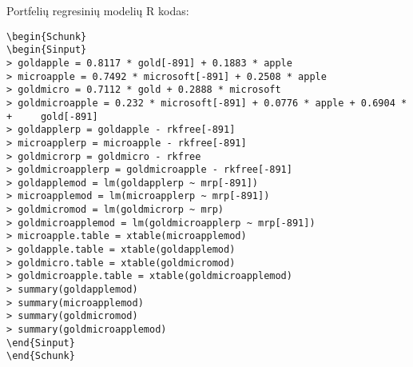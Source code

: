 \documentclass[12pt, a14paper, lithuanian]{article}
\begin{document}
\begin{comment}
6.478507 \% apple

93.5215 * 0.2888 = 27.00901 \% microsoft

93.5215 * 0.7112 = 66.51249 \% aukso

\begin{Schunk}
\begin{Sinput}
> sd((6.478507 * apple + 27.00901 * microsoft[-891] + 66.51249 * 
+     gold[-891])/100)
\end{Sinput}
\begin{Soutput}
[1] 0.009455108
\end{Soutput}
\end{Schunk}
\end{comment}

 Portfelių regresinių modelių R kodas:
\begin{verbatim}
\begin{Schunk}
\begin{Sinput}
> goldapple = 0.8117 * gold[-891] + 0.1883 * apple
> microapple = 0.7492 * microsoft[-891] + 0.2508 * apple
> goldmicro = 0.7112 * gold + 0.2888 * microsoft
> goldmicroapple = 0.232 * microsoft[-891] + 0.0776 * apple + 0.6904 * 
+     gold[-891]
> goldapplerp = goldapple - rkfree[-891]
> microapplerp = microapple - rkfree[-891]
> goldmicrorp = goldmicro - rkfree
> goldmicroapplerp = goldmicroapple - rkfree[-891]
> goldapplemod = lm(goldapplerp ~ mrp[-891])
> microapplemod = lm(microapplerp ~ mrp[-891])
> goldmicromod = lm(goldmicrorp ~ mrp)
> goldmicroapplemod = lm(goldmicroapplerp ~ mrp[-891])
> microapple.table = xtable(microapplemod)
> goldapple.table = xtable(goldapplemod)
> goldmicro.table = xtable(goldmicromod)
> goldmicroapple.table = xtable(goldmicroapplemod)
> summary(goldapplemod)
> summary(microapplemod)
> summary(goldmicromod)
> summary(goldmicroapplemod)
\end{Sinput}
\end{Schunk}
\end{verbatim}
\end{document}
